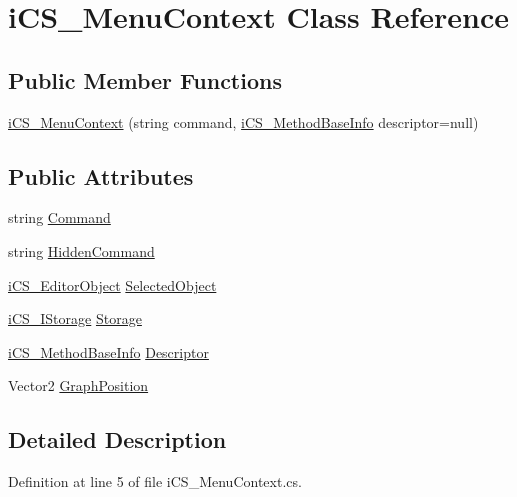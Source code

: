 \hypertarget{classi_c_s___menu_context}{\section{i\+C\+S\+\_\+\+Menu\+Context Class Reference}
\label{classi_c_s___menu_context}
}
\subsection*{Public Member Functions}
\begin{DoxyCompactItemize}
\item 
\hyperlink{classi_c_s___menu_context_a7c98fc07f9982cffa86e3ae3ec8a0b3f}{i\+C\+S\+\_\+\+Menu\+Context} (string command, \hyperlink{classi_c_s___method_base_info}{i\+C\+S\+\_\+\+Method\+Base\+Info} descriptor=null)
\end{DoxyCompactItemize}
\subsection*{Public Attributes}
\begin{DoxyCompactItemize}
\item 
string \hyperlink{classi_c_s___menu_context_aaf69642301985db5fc208b7f12ebdbe6}{Command}
\item 
string \hyperlink{classi_c_s___menu_context_a6c636698e7d84ff8b65adca8b346903a}{Hidden\+Command}
\item 
\hyperlink{classi_c_s___editor_object}{i\+C\+S\+\_\+\+Editor\+Object} \hyperlink{classi_c_s___menu_context_aac907340e44ae6e34f94e8e3ecf8a08c}{Selected\+Object}
\item 
\hyperlink{classi_c_s___i_storage}{i\+C\+S\+\_\+\+I\+Storage} \hyperlink{classi_c_s___menu_context_a919357230d82a0cbc17418cf2ef599f5}{Storage}
\item 
\hyperlink{classi_c_s___method_base_info}{i\+C\+S\+\_\+\+Method\+Base\+Info} \hyperlink{classi_c_s___menu_context_a09ca17026e7fda295f305501638a8221}{Descriptor}
\item 
Vector2 \hyperlink{classi_c_s___menu_context_ad88d30549c87db47baf49398c832a3f6}{Graph\+Position}
\end{DoxyCompactItemize}


\subsection{Detailed Description}


Definition at line 5 of file i\+C\+S\+\_\+\+Menu\+Context.\+cs.



